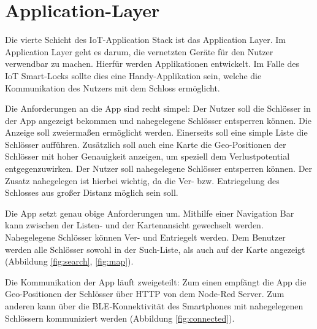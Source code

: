 
\section{Application-Layer}
Die vierte Schicht des \ac{IoT}-Application Stack ist das Application Layer. Im Application Layer geht es darum, die vernetzten Geräte für den Nutzer verwendbar zu machen. Hierfür werden Applikationen entwickelt. Im Falle des \ac{IoT} Smart-Locks sollte dies eine Handy-Applikation sein, welche die Kommunikation des Nutzers mit dem Schloss ermöglicht.

Die Anforderungen an die App sind recht simpel: Der Nutzer soll die Schlösser in der App angezeigt bekommen und nahegelegene Schlösser entsperren können. Die Anzeige soll zweiermaßen ermöglicht werden. Einerseits soll eine simple Liste die Schlösser aufführen. Zusätzlich soll auch eine Karte die Geo-Positionen der Schlösser mit hoher Genauigkeit anzeigen, um speziell dem Verlustpotential entgegenzuwirken. Der Nutzer soll nahegelegene Schlösser entsperren können. Der Zusatz nahegelegen ist hierbei wichtig, da die Ver- bzw. Entriegelung des Schlosses aus großer Distanz möglich sein soll.

Die App setzt genau obige Anforderungen um. Mithilfe einer Navigation Bar kann zwischen der Listen- und der Kartenansicht gewechselt werden. Nahegelegene Schlösser können Ver- und Entriegelt werden. Dem Benutzer werden alle Schlösser sowohl in der Such-Liste, als auch auf der Karte angezeigt (Abbildung \ref{fig:search}, \ref{fig:map}).

Die Kommunikation der App läuft zweigeteilt: Zum einen empfängt die App die Geo-Positionen der Schlösser über \ac{HTTP} von dem Node-Red Server. Zum anderen kann über die \ac{BLE}-Konnektivität des Smartphones mit nahegelegenen Schlössern kommuniziert werden (Abbildung \ref{fig:connected}).

